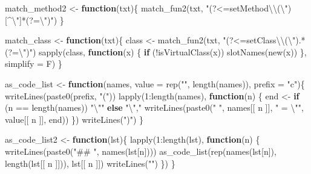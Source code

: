 \documentclass[
]{article}
\newenvironment{Shaded}{\begin{snugshade}}{\end{snugshade}}
\newcommand{\AttributeTok}[1]{\textcolor[rgb]{0.77,0.63,0.00}{#1}}
\newcommand{\ControlFlowTok}[1]{\textcolor[rgb]{0.13,0.29,0.53}{\textbf{#1}}}
\newcommand{\DecValTok}[1]{\textcolor[rgb]{0.00,0.00,0.81}{#1}}
\newcommand{\FunctionTok}[1]{\textcolor[rgb]{0.00,0.00,0.00}{#1}}
\newcommand{\NormalTok}[1]{#1}
\newcommand{\OtherTok}[1]{\textcolor[rgb]{0.56,0.35,0.01}{#1}}
\newcommand{\SpecialCharTok}[1]{\textcolor[rgb]{0.00,0.00,0.00}{#1}}
\newcommand{\StringTok}[1]{\textcolor[rgb]{0.31,0.60,0.02}{#1}}
\begin{document}
\begin{Shaded}
\begin{Highlighting}[]
\NormalTok{match\_method2 }\OtherTok{\textless{}{-}} \ControlFlowTok{function}\NormalTok{(txt)\{}
  \FunctionTok{match\_fun2}\NormalTok{(txt, }\StringTok{"(?\textless{}=setMethod}\SpecialCharTok{\textbackslash{}\textbackslash{}}\StringTok{(}\SpecialCharTok{\textbackslash{}"}\StringTok{)[\^{}}\SpecialCharTok{\textbackslash{}"}\StringTok{]*(?=}\SpecialCharTok{\textbackslash{}"}\StringTok{)"}\NormalTok{)}
\NormalTok{\}}

\NormalTok{match\_class }\OtherTok{\textless{}{-}} \ControlFlowTok{function}\NormalTok{(txt)\{}
\NormalTok{  class }\OtherTok{\textless{}{-}} \FunctionTok{match\_fun2}\NormalTok{(txt, }\StringTok{"(?\textless{}=setClass}\SpecialCharTok{\textbackslash{}\textbackslash{}}\StringTok{(}\SpecialCharTok{\textbackslash{}"}\StringTok{).*(?=}\SpecialCharTok{\textbackslash{}"}\StringTok{)"}\NormalTok{)}
  \FunctionTok{sapply}\NormalTok{(class,}
    \ControlFlowTok{function}\NormalTok{(x) \{}
      \ControlFlowTok{if}\NormalTok{ (}\SpecialCharTok{!}\FunctionTok{isVirtualClass}\NormalTok{(x))}
        \FunctionTok{slotNames}\NormalTok{(}\FunctionTok{new}\NormalTok{(x))}
\NormalTok{    \}, }\AttributeTok{simplify =}\NormalTok{ F)}
\NormalTok{\}}

\NormalTok{as\_code\_list }\OtherTok{\textless{}{-}} \ControlFlowTok{function}\NormalTok{(names, }\AttributeTok{value =} \FunctionTok{rep}\NormalTok{(}\StringTok{""}\NormalTok{, }\FunctionTok{length}\NormalTok{(names)), }\AttributeTok{prefix =} \StringTok{"c"}\NormalTok{)\{}
  \FunctionTok{writeLines}\NormalTok{(}\FunctionTok{paste0}\NormalTok{(prefix, }\StringTok{"("}\NormalTok{))}
  \FunctionTok{lapply}\NormalTok{(}\DecValTok{1}\SpecialCharTok{:}\FunctionTok{length}\NormalTok{(names),}
    \ControlFlowTok{function}\NormalTok{(n) \{}
\NormalTok{      end }\OtherTok{\textless{}{-}} \ControlFlowTok{if}\NormalTok{ (n }\SpecialCharTok{==} \FunctionTok{length}\NormalTok{(names)) }\StringTok{"}\SpecialCharTok{\textbackslash{}"}\StringTok{"} \ControlFlowTok{else} \StringTok{"}\SpecialCharTok{\textbackslash{}"}\StringTok{,"}
      \FunctionTok{writeLines}\NormalTok{(}\FunctionTok{paste0}\NormalTok{(}\StringTok{"  "}\NormalTok{, names[[ n ]], }\StringTok{" = }\SpecialCharTok{\textbackslash{}"}\StringTok{"}\NormalTok{, value[[ n ]], end))}
\NormalTok{    \})}
  \FunctionTok{writeLines}\NormalTok{(}\StringTok{")"}\NormalTok{)}
\NormalTok{\}}

\NormalTok{as\_code\_list2 }\OtherTok{\textless{}{-}} \ControlFlowTok{function}\NormalTok{(lst)\{}
  \FunctionTok{lapply}\NormalTok{(}\DecValTok{1}\SpecialCharTok{:}\FunctionTok{length}\NormalTok{(lst),}
    \ControlFlowTok{function}\NormalTok{(n) \{}
      \FunctionTok{writeLines}\NormalTok{(}\FunctionTok{paste0}\NormalTok{(}\StringTok{"\#\# "}\NormalTok{, }\FunctionTok{names}\NormalTok{(lst[n])))}
      \FunctionTok{as\_code\_list}\NormalTok{(}\FunctionTok{rep}\NormalTok{(}\FunctionTok{names}\NormalTok{(lst[n]), }\FunctionTok{length}\NormalTok{(lst[[ n ]])),}
\NormalTok{        lst[[ n ]])}
      \FunctionTok{writeLines}\NormalTok{(}\StringTok{""}\NormalTok{)}
\NormalTok{    \})}
\NormalTok{\}}


\end{Highlighting}
\end{Shaded}
\end{document}
